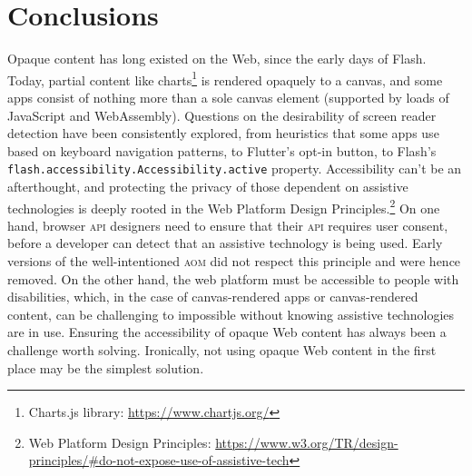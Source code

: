 \documentclass[sigconf]{acmart}
\begin{document}
\section{Conclusions}

Opaque content has long existed on the Web, since the early days of Flash. Today, partial content like charts\footnote{Charts.js library: \url{https://www.chartjs.org/}} is rendered opaquely to a canvas, and some apps consist of nothing more than a sole canvas element (supported by loads of JavaScript and WebAssembly). Questions on the desirability of screen reader detection have been consistently explored, from heuristics that some apps use based on keyboard navigation patterns, to Flutter's opt-in button, to Flash's \texttt{flash.accessibility.Accessibility.active} property. Accessibility can't be an afterthought, and protecting the privacy of those dependent on assistive technologies is deeply rooted in the Web Platform Design Principles.\footnote{Web Platform Design Principles: \url{https://www.w3.org/TR/design-principles/#do-not-expose-use-of-assistive-tech}} On one hand, browser \textsc{api} designers need to ensure that their \textsc{api} requires user consent, before a developer can detect that an assistive technology is being used. Early versions of the well-intentioned \textsc{aom} did not respect this principle and were hence removed. On the other hand, the web platform must be accessible to people with disabilities, which, in the case of canvas-rendered apps or canvas-rendered content, can be challenging to impossible without knowing assistive technologies are in use. Ensuring the accessibility of opaque Web content has always been a challenge worth solving. Ironically, not using opaque Web content in the first place may be the simplest solution.
\end{document}
